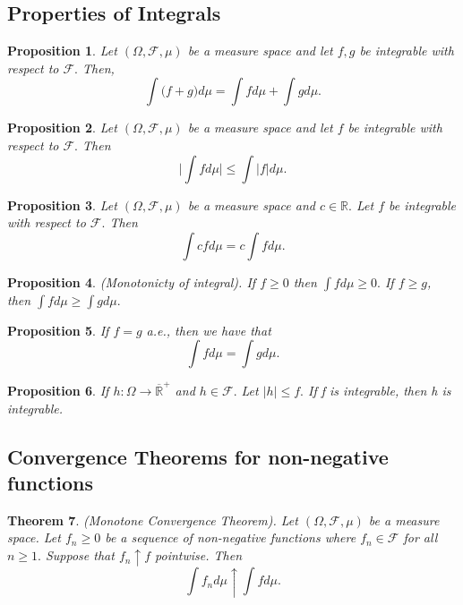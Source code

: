 \documentclass[twoside]{article}
\newcounter{lecnum}
\newtheorem{theorem}{Theorem}[lecnum]
\newtheorem{proposition}[theorem]{Proposition}
\newcommand{\sigmalgebra}{\mathcal{F}}
\newcommand{\positiveextendedreal}{\overline{\mathbb{R}}^+}
\begin{document}
\subsection{Properties of Integrals}


\begin{proposition}Let $(\Omega, \sigmalgebra, \mu)$ be a measure space and let $f, g$ be integrable with respect to $\sigmalgebra.$ Then, 
$$
\int\bigg(f + g \bigg)d\mu = \int fd\mu + \int gd\mu.
$$
\end{proposition}

\begin{proposition}Let $(\Omega, \sigmalgebra, \mu)$ be a measure space and let $f$ be integrable with respect to $\sigmalgebra.$ Then 
$$
\bigg|\int fd\mu \bigg| \leq \int |f|d\mu.
$$
\end{proposition}

\begin{proposition}Let $(\Omega, \sigmalgebra, \mu)$ be a measure space and $c \in \mathbb{R}.$ Let $f$ be integrable with respect to $\sigmalgebra.$ Then 
$$
\int cfd\mu = c \int fd\mu.
$$
\end{proposition}

\begin{proposition}(Monotonicty of integral). If $f \geq 0$ then $\int fd\mu \geq 0.$ If $f \geq g$, then $\int fd\mu \geq \int gd\mu .$
\end{proposition}

\begin{proposition}If $f = g$ a.e., then we have that 
$$
\int fd\mu = \int gd\mu.
$$
\end{proposition}

\begin{proposition}If $h: \Omega \rightarrow \positiveextendedreal$ and $h \in \sigmalgebra.$ Let $|h| \leq f.$ If f is integrable, then h is integrable.
\end{proposition}

\subsection{Convergence Theorems for non-negative functions}

\begin{theorem}(Monotone Convergence Theorem). Let $(\Omega, \sigmalgebra, \mu)$ be a measure space. Let $f_n \geq 0$ be a sequence of non-negative functions where $f_n \in \mathcal{F}$ for all $n \geq 1.$ Suppose that $f_n \uparrow f$ pointwise. Then 
$$
\int f_nd\mu \uparrow \int fd\mu.
$$
\end{theorem}
\end{document}
